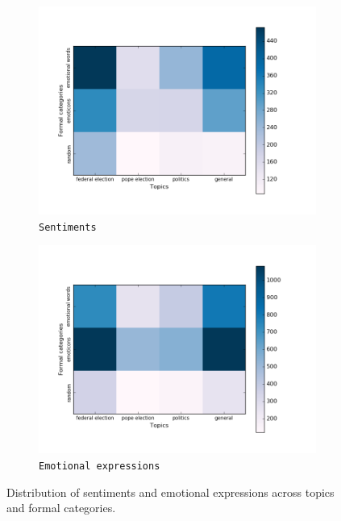 \begin{figure}[htbp!]
{
\centering
\begin{subfigure}{.5\textwidth}
  \centering
  \includegraphics[width=\linewidth]{img/sentiment_stat.png}
  \caption{\texttt{Sentiments}}\label{snt:fig:crp-sent-emo-distr-a}
\end{subfigure}%
\begin{subfigure}{.5\textwidth}
  \centering
  \includegraphics[width=\linewidth]{img/emo-expression_stat.png}
  \caption{\texttt{Emotional expressions}}\label{snt:fig:crp-sent-emo-distr-b}
\end{subfigure}
}
\caption{Distribution of sentiments and emotional expressions across
  topics and formal categories.}\label{snt:fig:crp-sent-emo-distr}
\end{figure}

